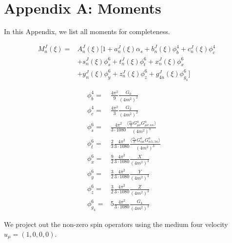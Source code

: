 \documentclass[aps,prc,superscriptaddress,showpacs,floatfix, nofootinbib,preprintnumbers,twocolumn]{revtex4}
\begin{document}
\section*{Appendix A: Moments}
In this Appendix, we list all moments for completeness.
\begin{small}
\begin{align}
M^{J}_n(\xi)=&A^{J}_n(\xi)[1+a^{J}_n(\xi)\alpha_s+b^{J}_n(\xi)\phi^4_b+c^{J}_n(\xi)\phi^4_c \nonumber\\
&+s^{J}_n(\xi)\phi^6_s+t^{J}_n(\xi)\phi^6_t+x^{J}_n(\xi)\phi^6_x \nonumber\\
&+y^{J}_n(\xi)\phi^6_y+z^{J}_n(\xi)\phi^6_z+g^{J}_{4n}(\xi)\phi^6_{g_4}]
\end{align}
\end{small}
\begin{small}
\begin{align}
\phi^4_b=&\frac{4\pi^2}{9}\frac{G_0 }{(4m^2)^2}\\
\phi^4_c=&\frac{4\pi^2}{3}\frac{G_2}{(4m^2)^2}&\\
\phi^6_s=&\frac{4\pi^2}{3\cdot 1080}\frac{\langle\frac{\alpha_s}{\pi}G^a_{\mu\nu}G^a_{\mu\nu;\kappa\kappa}\rangle}{(4m^2)^3}\\
\phi^6_t=&\frac{2}{3}\frac{4\pi^2}{3\cdot 1080}\frac{\langle\frac{\alpha_s}{\pi}G^a_{\alpha\kappa}G^a_{\alpha\lambda;\lambda\kappa}\rangle}{(4m^2)^3}\\
\phi^6_x=&\frac{9}{2}\frac{4\pi^2}{3\cdot 1080}\frac{X}{(4m^2)^3}\\
\phi^6_y=&\frac{3}{2}\frac{4\pi^2}{3\cdot 1080}\frac{Y}{(4m^2)^3}\\
\phi^6_z=&\frac{3}{2}\frac{4\pi^2}{3\cdot 1080}\frac{Z}{(4m^2)^3}\\
\phi^6_{g_4}=&5\frac{4\pi^2}{3\cdot 1080}\frac{G_4}{(4m^2)^3}
\end{align}
\end{small}
We project out the non-zero spin operators using the medium four velocity $u_{\mu}=(1,0,0,0)$. 
\end{document}
